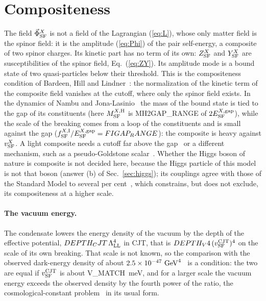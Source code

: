 \documentclass[aps,prd,onecolumn,superscriptaddress,nofootinbib,floatfix,longbibliography]{revtex4-2}
\newcommand{\LL}{{\rm LL}}
\newcommand{\SF}{{\rm SF}}
\begin{document}
\section{Compositeness}
\label{sec:composite}

The field $\vec\Phi^X_\SF$ is not a field of the Lagrangian (\ref{eq:L}), whose only matter field is the spinor field: it is the amplitude
(\ref{eq:Phi}) of the pair self-energy, a composite of two spinor charges. Its kinetic part has no term of its own: $Z^X_\SF$ and $Y^X_\SF$
are susceptibilities of the spinor field, Eq.~(\ref{eq:ZY}). Its amplitude mode is a bound state of two quasi-particles below their
threshold. This is the compositeness condition of Bardeen, Hill and Lindner~\cite{BHL1990}: the normalization of the kinetic term of the
composite field vanishes at the cutoff, where only the spinor field exists. In the dynamics of Nambu and
Jona-Lasinio~\cite{NJL1961} the mass of the bound state is tied to the gap of its constituents (here $M^{X,{\rm H}}_\SF$ is {{MH2GAP_RANGE}}
of $2E^{X,{\rm gap}}_\SF$), while the scale of the breaking comes from a loop of the constituents and is small against the gap
($f^{X,{\rm I}}_\SF/E^{X,{\rm gap}}_\SF={{FIGAP_RANGE}}$): the composite is heavy against $v^X_\SF$. A light composite needs a cutoff far
above the gap~\cite{BHL1990,HillSimmons2003} or a different mechanism, such as a pseudo-Goldstone scalar~\cite{KaplanGeorgi1984,Agashe2005}.
Whether the Higgs boson of nature is composite is not decided here, because the Higgs particle of this model is not that boson
(answer (b) of Sec.~\ref{sec:higgs}); its couplings agree with those of the Standard Model to several
per cent~\cite{ATLAS2022,CMS2022}, which constrains, but does not exclude, its compositeness at a higher scale.

\paragraph*{The vacuum energy.} The condensate lowers the energy density of the vacuum by the depth of the effective potential,
${{DEPTH_CJT}}\,\Lambda_\LL^4$ in CJT, that is ${{DEPTH_V4}}\,(v^{\rm CJT}_\SF)^4$ on the scale of its own breaking. That scale is not known, so the
comparison with the observed dark-energy density of about $2.5\times10^{-47}~{\rm GeV}^4$~\cite{PDG2024} is a condition: the two are
equal if $v^{\rm CJT}_\SF$ is about {{V_MATCH}}~meV, and for a larger scale the vacuum energy exceeds the observed density by the fourth
power of the ratio, the cosmological-constant problem~\cite{Weinberg1989} in its usual form.
\end{document}
